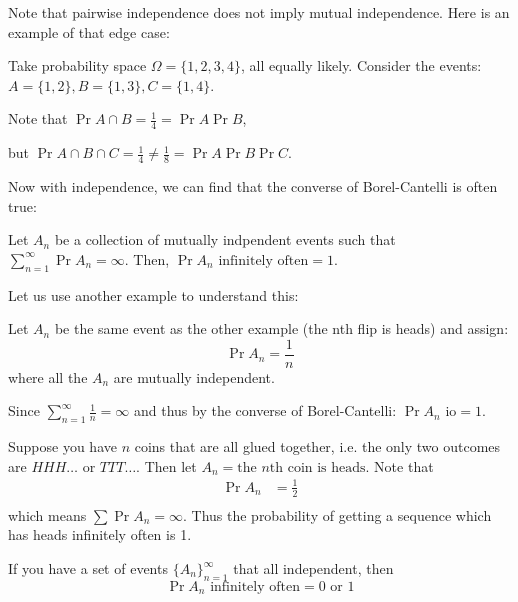 Note that pairwise independence does not imply mutual independence. Here is
an example of that edge case:

\begin{example}
    Take probability space $\Omega = \{1, 2, 3, 4\}$, all equally likely. Consider the events:
    $A = \{1, 2\}, B = \{1, 3\}, C=\{1,4\}$.

    Note that $\Pr{A \cap B} = \frac{1}{4} = \Pr{A} \Pr{B}$, 
    
    but
    $\Pr{A \cap B \cap C} = \frac{1}{4} \neq \frac{1}{8} = \Pr{A} \Pr{B} \Pr{C}$.
\end{example}

Now with independence, we can find that the converse of Borel-Cantelli is often true:

\begin{theorem} 
    Let $A_n$ be a collection of mutually indpendent events such that
    $\sum_{n = 1}^{\infty} \Pr{A_n} = \infty$. Then, $\Pr{A_n \text{ infinitely often}} = 1$.
\end{theorem}

Let us use another example to understand this:

\begin{example}
    Let $A_n$ be the same event as the other example (the nth flip is heads) and assign:
    \[ \Pr{A_n} = \frac{1}{n} \]
    where all the $A_n$ are mutually independent.

    Since $\sum_{n = 1}^{\infty} \frac{1}{n} = \infty$ and thus by the converse of Borel-Cantelli:
    $\Pr{A_n \text{ io}} = 1$.
\end{example}

\begin{example}
    Suppose you have $n$ coins that are all glued together, i.e. the only two outcomes
    are $HHH\dots$ or $TTT\dots$. Then let $A_n = {\text{the $n$th coin is heads}}$. Note that
    \begin{align*}
        \Pr{A_n} &= \frac{1}{2} \\
    \end{align*}
    which means $\sum \Pr{A_n} = \infty$. Thus the probability of getting a sequence which has heads
    infinitely often is 1.
\end{example}

\begin{theorem}
    If you have a set of events $\{A_n\}_{n = 1}^{\infty}$ that all independent,
    then
    \[ \Pr{A_n \text{ infinitely often}} = 0 \text{ or } 1 \]
\end{theorem}

